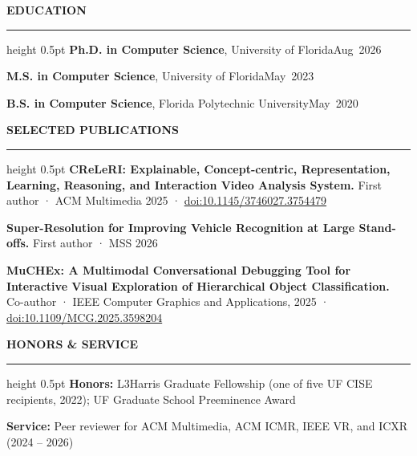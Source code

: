\documentclass[10pt,letterpaper]{article}
\newcommand{\ressection}[1]{\par\addvspace{9pt}\textbf{\MakeUppercase{#1}}\par\nobreak\vspace{1.5pt}\hrule height 0.5pt\nobreak\vspace{4.5pt}}
\newcommand{\resrow}[2]{\noindent #1\hfill\mbox{#2}\par}
\newcommand{\respub}[2]{\textbf{#1.} #2\par\vspace{2.5pt}}
\begin{document}
\ressection{Education}
\resrow{\textbf{Ph.D. in Computer Science}, University of Florida}{Aug 2026}
\resrow{\textbf{M.S. in Computer Science}, University of Florida}{May 2023}
\resrow{\textbf{B.S. in Computer Science}, Florida Polytechnic University}{May 2020}

\ressection{Selected Publications}
\respub{CReLeRI: Explainable, Concept-centric, Representation, Learning, Reasoning, and Interaction Video Analysis System}{First author · ACM Multimedia 2025 · \href{https://doi.org/10.1145/3746027.3754479}{doi:10.1145/3746027.3754479}}
\respub{Super-Resolution for Improving Vehicle Recognition at Large Stand-offs}{First author · MSS 2026}
\respub{MuCHEx: A Multimodal Conversational Debugging Tool for Interactive Visual Exploration of Hierarchical Object Classification}{Co-author · IEEE Computer Graphics and Applications, 2025 · \href{https://doi.org/10.1109/MCG.2025.3598204}{doi:10.1109/MCG.2025.3598204}}

\ressection{Honors \& Service}
\textbf{Honors:} L3Harris Graduate Fellowship (one of five UF CISE recipients, 2022); UF Graduate School Preeminence Award\par\vspace{1pt}
\textbf{Service:} Peer reviewer for ACM Multimedia, ACM ICMR, IEEE VR, and ICXR (2024 – 2026)
\end{document}
